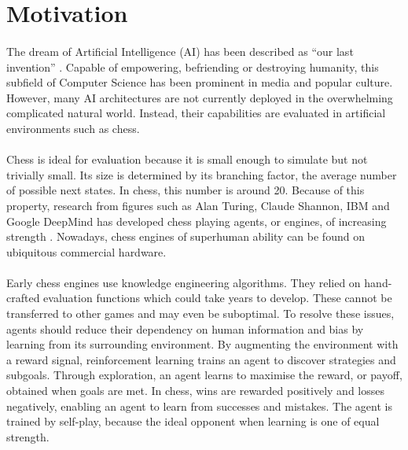 \documentclass[12pt,a4paper]{book}
\begin{document}
\section{Motivation}

\paragraph{} The dream of Artificial Intelligence (AI) has been described as ``our last invention'' \cite{ailast}. Capable of empowering, befriending or destroying humanity, this subfield of Computer Science has been prominent in media and popular culture. However, many AI architectures are not currently deployed in the overwhelming complicated natural world. Instead, their capabilities are evaluated in artificial environments such as chess.

\paragraph{} Chess is ideal for evaluation because it is small enough to simulate but not trivially small. Its size is determined by its branching factor, the average number of possible next states. In chess, this number is around 20. Because of this property, research from figures such as Alan Turing, Claude Shannon, IBM and Google DeepMind has developed chess playing agents, or engines, of increasing strength \cite{michieIntel} \cite{shannonlegendary} \cite{deepBlue} \cite{alphazero}. Nowadays, chess engines of superhuman ability can be found on ubiquitous commercial hardware.

\paragraph{} Early chess engines use knowledge engineering algorithms. They relied on hand-crafted evaluation functions which could take years to develop. \cite{stockfish} These cannot be transferred to other games and may even be suboptimal. To resolve these issues, agents should reduce their dependency on human information and bias by learning from its surrounding environment. By augmenting the environment with a reward signal, reinforcement learning trains an agent to discover strategies and subgoals. Through exploration, an agent learns to maximise the reward, or payoff, obtained when goals are met. \cite{Sutton} In chess, wins are rewarded positively and losses negatively, enabling an agent to learn from successes and mistakes. The agent is trained by self-play, because the ideal opponent when learning is one of equal strength. \cite{ban}
\end{document}
